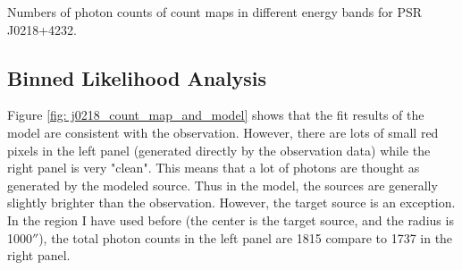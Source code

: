 \documentclass[12pt]{report}
\newcommand{\mycaption}[1]{\protect \caption{#1}}
\begin{document}
      \begin{table}[!htp]   
        \centering
        \mycaption{Numbers of photon counts of count maps in different energy bands for 
              PSR J0218+4232.}
        \label{table:j0218_ccube_photon_counts}
      \end{table}

    \subsection{Binned Likelihood Analysis}
      Figure \ref{fig: j0218_count_map_and_model} shows that the fit results of the model 
      are consistent with the observation. However, there are lots of small red pixels 
      in the left panel (generated directly by the observation data) while the 
      right panel is very "clean". This means that a lot of photons are thought as 
      generated by the modeled source. Thus in the model, the sources are generally 
      slightly brighter than the observation. However, the target
      source is an exception. In the region I have used before (the center is the 
      target source, and the radius is 1000$''$), the total photon counts in the left 
      panel are 1815 compare to 1737 in the right panel. 
\end{document}
